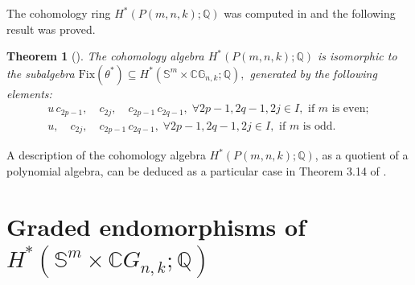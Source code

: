 \documentclass{amsart}
\newtheorem{theorem}{Theorem}[section]
\newcommand{\fix}{\mathrm{Fix}}
\begin{document}
	The cohomology ring $ H^*(P(m, n,k);\mathbb Q) $ was computed in \cite{mandal-sankaran2} and the following result was %
proved.
	\begin{theorem}[{\cite[Theorem 3.13]{mandal-sankaran2}}]\label{cohomology of P(m,n,k)}
		The %
cohomology algebra \( H^*(P(m,n,k); \mathbb{Q}) \) is isomorphic to the subalgebra
		$\mathrm{Fix}(\theta^*) \subseteq H^*(\mathbb{S}^m \times \mathbb{CG}_{n,k}; \mathbb{Q}),$
		generated by the following %
elements:
		\begin{align*}
			u \, c_{2p-1},\quad c_{2j},\quad c_{2p-1} \, c_{2q-1},\; \forall 2p-1, 2q-1, 2j \in I, \text{ if } m \text{ is even};\\
			u,\quad c_{2j},\quad c_{2p-1} \, c_{2q-1},\; \forall 2p-1, 2q-1, 2j \in I, \text{ if } m \text{ is odd}.
		\end{align*}
	\end{theorem}
	A description of the %
cohomology algebra $ H^*(P(m,n,k); \mathbb{Q}) $, as a quotient of a polynomial algebra, can be deduced as a particular case in Theorem 3.14 of \cite{mandal-sankaran2}.
	
	
	
	
	
	
	
	
	
	
	\section{Graded endomorphisms of $H^*(\mathbb S^m\times \mathbb CG_{n,k};\mathbb Q)$} \label{section 3}
	
\end{document}
